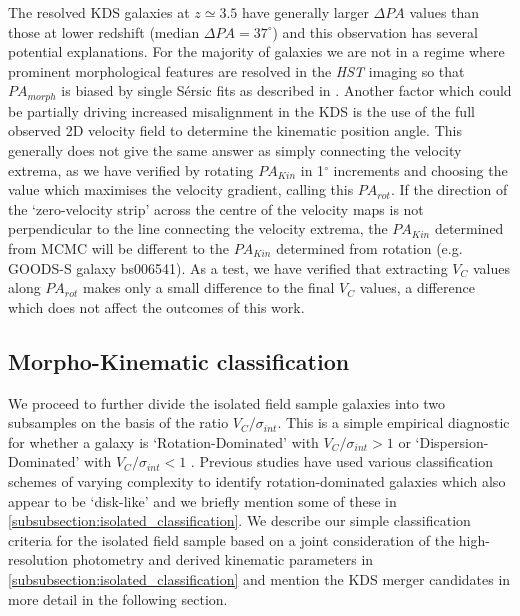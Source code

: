 \documentclass[fleqn,usenatbib]{mn2e}
\newcommand{\Sers}{S\'{e}rsic }
\begin{document}
The resolved KDS galaxies at $z\simeq3.5$ have generally larger $\Delta PA$ values than those at lower redshift (median $\Delta PA = 37^{\circ}$) and this observation has several potential explanations.
For the majority of galaxies we are not in a regime where prominent morphological features are resolved in the {\em HST} imaging so that $PA_{morph}$ is biased by single \Sers fits as described in \cite{Rodrigues2016}.
Another factor which could be partially driving increased misalignment in the KDS is the use of the full observed 2D velocity field to determine the kinematic position angle.
This generally does not give the same answer as simply connecting the velocity extrema, as we have verified by rotating $PA_{Kin}$ in 1$^{\circ}$ increments and choosing the value which maximises the velocity gradient, calling this $PA_{rot}$.
If the direction of the `zero-velocity strip' across the centre of the velocity maps is not perpendicular to the line connecting the velocity extrema, the $PA_{Kin}$ determined from MCMC will be different to the $PA_{Kin}$ determined from rotation (e.g. GOODS-S galaxy bs006541).
As a test, we have verified that extracting $V_{C}$ values along $PA_{rot}$ makes only a small difference to the final $V_{C}$ values, a difference which does not affect the outcomes of this work.


\subsection{Morpho-Kinematic classification}\label{subsec:morpho-kin-class}
We proceed to further divide the isolated field sample galaxies into two subsamples on the basis of the ratio $V_{C}/\sigma_{int}$.
This is a simple empirical diagnostic for whether a galaxy is `Rotation-Dominated' with $V_{C}/\sigma_{int} > 1$ or `Dispersion-Dominated' with $V_{C}/\sigma_{int} < 1$  \citep[i.e. a method to measure the prevalence of rotational and random motions;][]{Epinat2012,Wisnioski2015,Stott2016,Harrison2017}.
Previous studies have used various classification schemes of varying complexity to identify rotation-dominated galaxies which also appear to be `disk-like' and we briefly mention some of these in \cref{subsubsection:isolated_classification}.
We describe our simple classification criteria for the isolated field sample based on a joint consideration of the high-resolution photometry and derived kinematic parameters in \cref{subsubsection:isolated_classification} and mention the KDS merger candidates in more detail in the following section.
\end{document}

